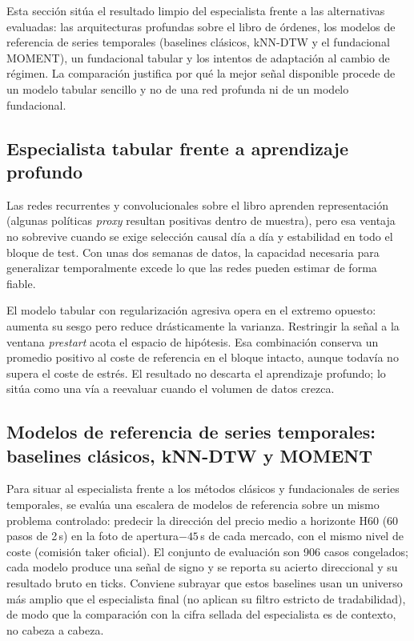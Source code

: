 Esta sección sitúa el resultado limpio del especialista frente a las alternativas evaluadas:
las arquitecturas profundas sobre el libro de órdenes, los modelos de referencia de series
temporales (baselines clásicos, kNN-DTW y el fundacional MOMENT), un fundacional tabular y
los intentos de adaptación al cambio de régimen. La comparación justifica por qué la mejor
señal disponible procede de un modelo tabular sencillo y no de una red profunda ni de un
modelo fundacional.

\subsection{Especialista tabular frente a aprendizaje profundo}

Las redes recurrentes y convolucionales sobre el libro aprenden representación (algunas
políticas \emph{proxy} resultan positivas dentro de muestra), pero esa ventaja no sobrevive
cuando se exige selección causal día a día y estabilidad en todo el bloque de test. Con unas
dos semanas de datos, la capacidad necesaria para generalizar temporalmente excede lo que
las redes pueden estimar de forma fiable.

El modelo tabular con regularización agresiva opera en el extremo opuesto: aumenta su sesgo
pero reduce drásticamente la varianza. Restringir la señal a la ventana \emph{prestart} acota
el espacio de hipótesis. Esa combinación conserva un promedio positivo al coste de referencia
en el bloque intacto, aunque todavía no supera el coste de estrés. El resultado no descarta el
aprendizaje profundo; lo sitúa como una vía a reevaluar cuando el volumen de datos crezca.

\subsection{Modelos de referencia de series temporales: baselines clásicos, kNN-DTW y MOMENT}
\label{sec::escalera}

Para situar al especialista frente a los métodos clásicos y fundacionales de series
temporales, se evalúa una escalera de modelos de referencia sobre un mismo problema
controlado: predecir la dirección del precio medio a horizonte H60
(60 pasos de 2\,s) en la foto de apertura$-45$\,s de cada mercado, con el mismo nivel de
coste (comisión taker oficial). El conjunto de evaluación son 906 casos congelados;
cada modelo produce una señal de signo y se reporta su acierto direccional y su
resultado bruto en ticks. Conviene subrayar que estos baselines usan un universo más
amplio que el especialista final (no aplican su filtro estricto de tradabilidad), de
modo que la comparación con la cifra sellada del especialista es de contexto, no
cabeza a cabeza.

